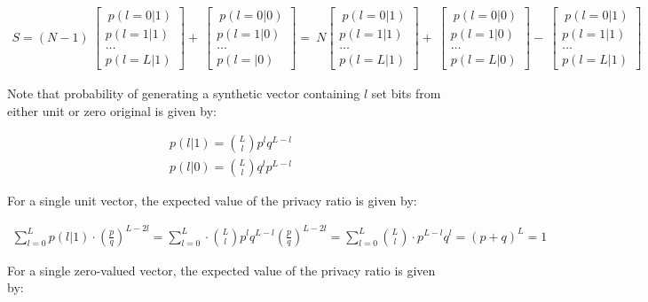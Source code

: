 \documentclass[11pt,draft]{article}
\begin{document}
\begin{align}
S = (N-1) \
 \begin{bmatrix}  \
  p(l=0|1) \\
  p(l=1|1) \\
  \dots \\
  p(l=L|1)
\end{bmatrix} + \
 \begin{bmatrix}  \
  p(l=0|0) \\
  p(l=1|0) \\
  \dots \\
  p(l=|0)
\end{bmatrix} = \
 N \begin{bmatrix}  \
  p(l=0|1) \\
  p(l=1|1) \\
  \dots \\
  p(l=L|1)
\end{bmatrix} + \
 \begin{bmatrix}  \
  p(l=0|0) \\
  p(l=1|0) \\
  \dots \\
  p(l=L|0)
\end{bmatrix} - \
 \begin{bmatrix}  \
  p(l=0|1) \\
  p(l=1|1) \\
  \dots \\
  p(l=L|1)
\end{bmatrix}
\end{align}

Note that probability of generating a synthetic vector containing $l$ set bits from either unit or zero original is given by:

\begin{align}
 p(l|1) = \binom{L}{l} p^lq^{L-l} \\
 p(l|0) = \binom{L}{l} q^lp^{L-l}
\end{align}

For a single unit vector, the expected value of the privacy ratio is given by:

\begin{align}
\sum_{l=0}^{L}   p(l|1)  \cdot  \left ( \frac{p}{q} \right )^ {L - 2l} = \sum_{l=0}^{L}  \cdot   \binom{L}{l} p^lq^{L-l} \left ( \frac{p}{q} \right )^ {L - 2l} =\sum_{l=0}^{L}  \binom{L}{l} \cdot p^{L-l}q^{l} = (p+q)^L = 1
\end{align}

For a single zero-valued vector, the expected value of the privacy ratio is given by:
\end{document}
